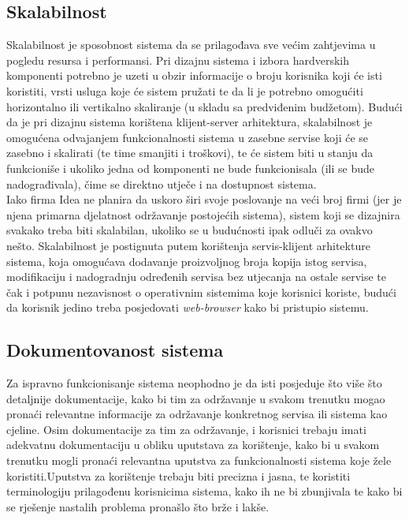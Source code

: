 \documentclass[12pt,a4paper]{article}
\begin{document}
\subsection{Skalabilnost}

\quad Skalabilnost je sposobnost sistema da se prilagođava sve većim zahtjevima u pogledu resursa i performansi. Pri dizajnu sistema i izbora hardverskih komponenti potrebno je uzeti u obzir informacije o broju korisnika koji će isti koristiti, vrsti usluga koje će sistem pružati te da li je potrebno omogućiti horizontalno ili vertikalno skaliranje (u skladu sa predviđenim budžetom). Budući da je pri dizajnu sistema korištena klijent-server arhitektura, skalabilnost je omogućena odvajanjem funkcionalnosti sistema u zasebne servise koji će se zasebno i skalirati (te time smanjiti i troškovi), te će sistem biti u stanju da funkcioniše i ukoliko jedna od komponenti ne bude funkcionisala (ili se bude nadograđivala), čime se direktno utječe i na dostupnost sistema. \\

Iako firma Idea ne planira da uskoro širi svoje poslovanje na veći broj firmi (jer je njena primarna djelatnost održavanje postojećih sistema), sistem koji se dizajnira svakako treba biti skalabilan, ukoliko se u budućnosti ipak odluči za ovakvo nešto. Skalabilnost je postignuta putem korištenja servis-klijent arhitekture sistema, koja omogućava dodavanje proizvoljnog broja kopija istog servisa, modifikaciju i nadogradnju određenih servisa bez utjecanja na ostale servise te čak i potpunu nezavisnost o operativnim sistemima koje korisnici koriste, budući da korisnik jedino treba posjedovati \textit{web-browser} kako bi pristupio sistemu.

\subsection{Dokumentovanost sistema}

\quad Za ispravno funkcionisanje sistema neophodno je da isti posjeduje što više što detaljnije dokumentacije, kako bi tim za održavanje u svakom trenutku mogao pronaći relevantne informacije za održavanje konkretnog servisa ili sistema kao cjeline. Osim dokumentacije za tim za održavanje, i korisnici trebaju imati adekvatnu dokumentaciju u obliku uputstava za korištenje, kako bi u svakom trenutku mogli pronaći relevantna uputstva za funkcionalnosti sistema koje žele koristiti.Uputstva za korištenje trebaju biti precizna i jasna, te koristiti terminologiju prilagođenu korisnicima sistema, kako ih ne bi zbunjivala te kako bi se rješenje nastalih problema pronašlo što brže i lakše. \\
\end{document}

